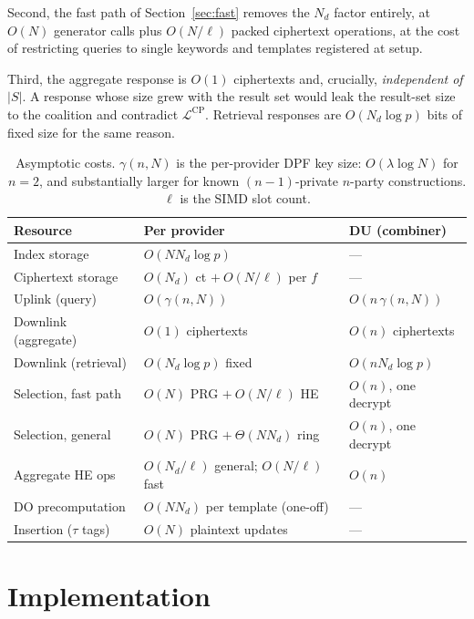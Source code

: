 \documentclass[journal]{IEEEtran}
\newcommand{\Leak}{\mathcal{L}}
\begin{document}
Second, the fast path of Section~\ref{sec:fast} removes the $N_d$ factor entirely, at $O(N)$ generator calls plus $O(N/\ell)$ packed ciphertext operations, at the cost of restricting queries to single keywords and templates registered at setup.

Third, the aggregate response is $O(1)$ ciphertexts and, crucially, \emph{independent of $|S|$}. A response whose size grew with the result set would leak the result-set size to the coalition and contradict $\Leak^{\text{CP}}$. Retrieval responses are $O(N_d\log p)$ bits of fixed size for the same reason.

\begin{table}[t]
\centering
\caption{Asymptotic costs. $\gamma(n,N)$ is the per-provider DPF key size: $O(\lambda\log N)$ for $n=2$, and substantially larger for known $(n{-}1)$-private $n$-party constructions. $\ell$ is the SIMD slot count.}
\label{tab:complexity}
\footnotesize
\renewcommand{\arraystretch}{1.2}
\begin{tabular*}{\columnwidth}{@{\extracolsep{\fill}}lll@{}}
\toprule
Resource & Per provider & DU (combiner) \\
\midrule
Index storage        & $O(N N_d\log p)$                 & --- \\
Ciphertext storage   & $O(N_d)$ ct $+\ O(N/\ell)$ per $f$ & --- \\
Uplink (query)       & $O(\gamma(n,N))$                 & $O(n\,\gamma(n,N))$ \\
Downlink (aggregate) & $O(1)$ ciphertexts               & $O(n)$ ciphertexts \\
Downlink (retrieval) & $O(N_d\log p)$ fixed             & $O(n N_d\log p)$ \\
Selection, fast path & $O(N)$ PRG $+\ O(N/\ell)$ HE     & $O(n)$, one decrypt \\
Selection, general   & $O(N)$ PRG $+\ \Theta(N N_d)$ ring & $O(n)$, one decrypt \\
Aggregate HE ops     & $O(N_d/\ell)$ general; $O(N/\ell)$ fast & $O(n)$ \\
DO precomputation    & $O(N N_d)$ per template (one-off) & --- \\
Insertion ($\tau$ tags) & $O(N)$ plaintext updates      & --- \\
\bottomrule
\end{tabular*}
\end{table}

\section{Implementation}
\label{sec:impl}
\end{document}
